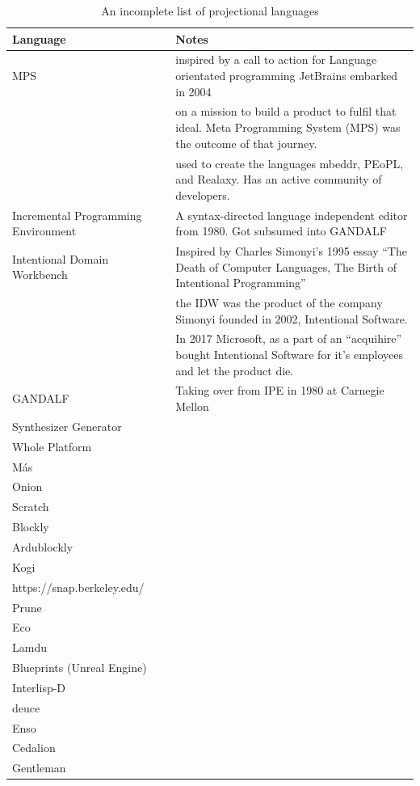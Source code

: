 \begin{table}[h]
    \begin{center}
        \begin{tabular}{ |l | l | } 
            \hline
            Language                   & Notes   \\
            \hline
            MPS & inspired by a call to action for Language orientated programming\cite{dmitriev2004language} JetBrains embarked in 2004 \\
                & on a mission to build a product to fulfil that ideal.  Meta Programming System (MPS) was the outcome of that journey.  \\
                & used to create the languages mbeddr, PEoPL, and Realaxy.  Has an active community of developers. \\
            Incremental Programming Environment\cite{medina1981incremental}  & A syntax-directed language independent editor from 1980. Got subsumed into GANDALF  \\
            Intentional Domain Workbench & Inspired by Charles Simonyi's 1995 essay ``The Death of Computer Languages, The Birth of Intentional Programming''\cite{simonyi1995death}\\
                    & the IDW was the product of the company Simonyi founded in 2002, Intentional Software. \\
                    & In 2017 Microsoft, as a part of an ``acquihire'' bought Intentional Software for it's employees and let the product die.\\
            GANDALF\cite{NotkinDavid1985TGp} & Taking over from IPE in 1980 at Carnegie Mellon \\
            Synthesizer Generator & \\
            Whole Platform & \\
            M\'as & \\
            Onion & \\
            Scratch & \\
            Blockly & \\
            Ardublockly & \\
            Kogi & \\
            https://snap.berkeley.edu/ & \\
            Prune & \\
            Eco & \\
            Lamdu & \\
            Blueprints (Unreal Engine) & \\
            Interlisp-D & \\
            deuce & \\
            Enso & \\
            Cedalion & \\  
            Gentleman & \\            
            \hline
        \end{tabular}
    \end{center}
    \caption{An incomplete list of projectional languages}
    \label{table:projectional_languages}
\end{table}


